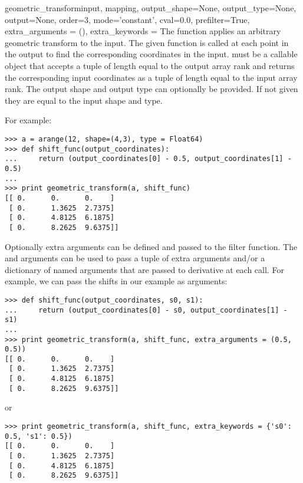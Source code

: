 \begin{funcdesc}{geometric_transform}{input, mapping, output_shape=None,
    output_type=None, output=None, order=3, mode='constant', cval=0.0,
    prefilter=True, extra_arguments = (), extra_keywords = {}} The  function applies an
  arbitrary geometric transform to the input. The given  
  function is called at each point in the output to find the corresponding 
  coordinates in the input.   must be a callable object that 
  accepts a tuple of length equal to the output array rank and returns the 
  corresponding input coordinates as a tuple of length equal to the input 
  array rank. The output shape and output type can optionally be provided. 
  If not given they are equal to the input shape and type.
  
  For example:
\begin{verbatim}
>>> a = arange(12, shape=(4,3), type = Float64)
>>> def shift_func(output_coordinates):
...     return (output_coordinates[0] - 0.5, output_coordinates[1] - 0.5)
... 
>>> print geometric_transform(a, shift_func)
[[ 0.      0.      0.    ]
 [ 0.      1.3625  2.7375]
 [ 0.      4.8125  6.1875]
 [ 0.      8.2625  9.6375]]  
\end{verbatim}  

  Optionally extra arguments can be defined and passed to the filter 
  function. The  and  arguments 
  can be used to pass a tuple of extra arguments and/or a dictionary of 
  named arguments that are passed to derivative at each call. For example, 
  we can pass the shifts in our example as arguments:

\begin{verbatim}
>>> def shift_func(output_coordinates, s0, s1):
...     return (output_coordinates[0] - s0, output_coordinates[1] - s1)
... 
>>> print geometric_transform(a, shift_func, extra_arguments = (0.5, 0.5))
[[ 0.      0.      0.    ]
 [ 0.      1.3625  2.7375]
 [ 0.      4.8125  6.1875]
 [ 0.      8.2625  9.6375]]  
\end{verbatim}  
or
\begin{verbatim}
>>> print geometric_transform(a, shift_func, extra_keywords = {'s0': 0.5, 's1': 0.5})
[[ 0.      0.      0.    ]
 [ 0.      1.3625  2.7375]
 [ 0.      4.8125  6.1875]
 [ 0.      8.2625  9.6375]]  
\end{verbatim}  

\end{funcdesc}

